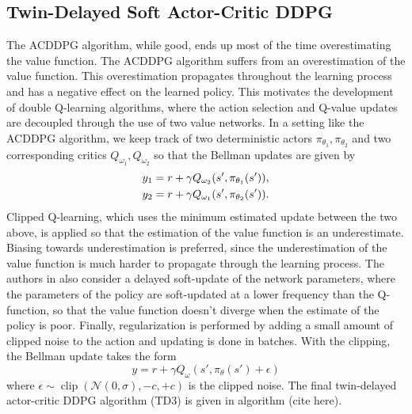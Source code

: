 \documentclass[10pt,conference]{IEEEtran}
\DeclareMathOperator{\Clip}{clip}
\begin{document}
	\subsection{Twin-Delayed Soft Actor-Critic DDPG}
	The ACDDPG algorithm, while good, ends up most of the time overestimating the value function. The ACDDPG algorithm suffers from an overestimation of the value function. This overestimation propagates throughout the learning process and has a negative effect on the learned policy. This motivates the development of double Q-learning algorithms, where the action selection and Q-value updates are decoupled through the use of two value networks. In a setting like the ACDDPG algorithm, we keep track of two deterministic actors $\pi_{\theta_1}, \pi_{\theta_2}$ and two corresponding critics $Q_{\omega_1}, Q_{\omega_2}$ so that the Bellman updates are given by 
	\begin{align*}
		\displaystyle &y_1 = r + \gamma Q_{\omega_2}(s', \pi_{\theta_1}(s')), \\
		&y_2 = r + \gamma Q_{\omega_1}(s', \pi_{\theta_2}(s')).
	\end{align*}
	Clipped Q-learning, which uses the minimum estimated update between the two above, is applied so that the estimation of the value function is an underestimate. Biasing towards underestimation is preferred, since the underestimation of the value function is much harder to propagate through the learning process. The authors in \cite{fujimoto2018addressing} also consider a delayed soft-update of the network parameters, where the parameters of the policy are soft-updated at a lower frequency than the Q-function, so that the value function doesn't diverge when the estimate of the policy is poor. Finally, regularization is performed by adding a small amount of clipped noise to the action and updating is done in batches. With the clipping, the Bellman update takes the form
	\begin{equation*}
		\displaystyle y = r + \gamma Q_{\omega}(s', \pi_\theta(s') + \epsilon)
	\end{equation*}
	where $\epsilon \sim \Clip(\mathcal{N}(0, \sigma), -c, + c)$ is the clipped noise. The final twin-delayed actor-critic DDPG algorithm (TD3) is given in algorithm (cite here).
\end{document}
